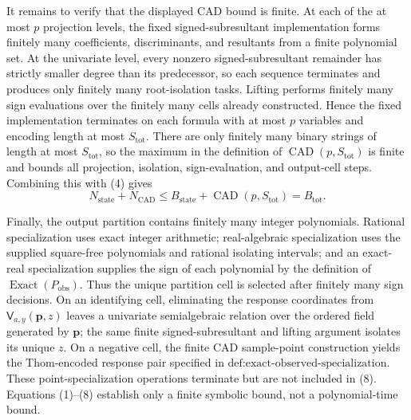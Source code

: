 It remains to verify that the displayed CAD bound is finite. At each of the at most \(p\) projection levels, the fixed signed-subresultant implementation forms finitely many coefficients, discriminants, and resultants from a finite polynomial set. At the univariate level, every nonzero signed-subresultant remainder has strictly smaller degree than its predecessor, so each sequence terminates and produces only finitely many root-isolation tasks. Lifting performs finitely many sign evaluations over the finitely many cells already constructed. Hence the fixed implementation terminates on each formula with at most \(p\) variables and encoding length at most \(S_{\mathrm{tot}}\). There are only finitely many binary strings of length at most \(S_{\mathrm{tot}}\), so the maximum in the definition of \(\operatorname{CAD}(p,S_{\mathrm{tot}})\) is finite and bounds all projection, isolation, sign-evaluation, and output-cell steps. Combining this with (4) gives
\[
N_{\mathrm{state}}+N_{\mathrm{CAD}}
\leq B_{\mathrm{state}}+\operatorname{CAD}(p,S_{\mathrm{tot}})
=B_{\mathrm{tot}}.
\tag{8}
\]

Finally, the output partition contains finitely many integer polynomials. Rational specialization uses exact integer arithmetic; real-algebraic specialization uses the supplied square-free polynomials and rational isolating intervals; and an exact-real specialization supplies the sign of each polynomial by the definition of \(\operatorname{Exact}(P_{\mathrm{obs}})\). Thus the unique partition cell is selected after finitely many sign decisions. On an identifying cell, eliminating the response coordinates from \(\mathsf V_{a,y}(\mathbf p,z)\) leaves a univariate semialgebraic relation over the ordered field generated by \(\mathbf p\); the same finite signed-subresultant and lifting argument isolates its unique \(z\). On a negative cell, the finite CAD sample-point construction yields the Thom-encoded response pair specified in \(\text{def:exact-observed-specialization}\). These point-specialization operations terminate but are not included in (8). Equations (1)--(8) establish only a finite symbolic bound, not a polynomial-time bound.